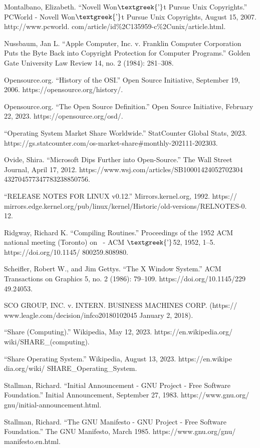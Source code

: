 \documentclass{article}
\begin{document}
Montalbano, Elizabeth. “Novell Won$\text{\textgreek{’}}$t Pursue Unix Copyrights.” PCWorld - Novell
Won$\text{\textgreek{’}}$t Pursue Unix Copyrights, August 15, 2007. http://www.pcworld.
com/article/id\%2C135959-c\%2Cunix/article.html. 

Nussbaum, Jan L. “Apple Computer, Inc. v. Franklin Computer Corporation Puts the Byte Back into Copyright Protection for
Computer Programs.” Golden Gate University Law Review 14, no. 2 (1984): 281–308. 

Opensource.org. “History of the OSI.” Open Source Initiative, September 19, 2006. https://opensource.org/history/. 

Opensource.org. “The Open Source Definition.” Open Source Initiative, February 22, 2023. https://opensource.org/osd/. 

“Operating System Market Share Worldwide.” StatCounter Global Stats, 2023.
https://gs.statcounter.com/os-market-share\#monthly-202111-202303. 

Ovide, Shira. “Microsoft Dips Further into Open-Source.” The Wall Street Journal, April 17, 2012.
https://www.wsj.com/articles/SB10001424052702304 432704577347783238850756. 

“RELEASE NOTES FOR LINUX v0.12.” Mirrors.kernel.org, 1992. https://
mirrors.edge.kernel.org/pub/linux/kernel/Historic/old-versions/RELNOTES-0. 12. 

Ridgway, Richard K. “Compiling Routines.” Proceedings of the 1952 ACM national meeting (Toronto) on \ {}- ACM
$\text{\textgreek{’}}$52, 1952, 1–5. https://doi.org/10.1145/ 800259.808980. 

Scheifler, Robert W., and Jim Gettys. “The X Window System.” ACM Transactions on Graphics 5, no. 2 (1986): 79–109.
https://doi.org/10.1145/229 49.24053. 

SCO GROUP, INC. v. INTERN. BUSINESS MACHINES CORP. (https:// www.leagle.com/decision/infco20180102045 January 2, 2018). 

“Share (Computing).” Wikipedia, May 12, 2023. https://en.wikipedia.org/ wiki/SHARE\_(computing). 

“Share Operating System.” Wikipedia, August 13, 2023. https://en.wikipe dia.org/wiki/ SHARE\_Operating\_System. 

Stallman, Richard. “Initial Announcement - GNU Project - Free Software Foundation.” Initial Announcement, September 27,
1983. https://www.gnu.org/ gnu/initial-announcement.html. 

Stallman, Richard. “The GNU Manifesto - GNU Project - Free Software Foundation.” The GNU Manifesto, March 1985.
https://www.gnu.org/gnu/ manifesto.en.html. 
\end{document}
